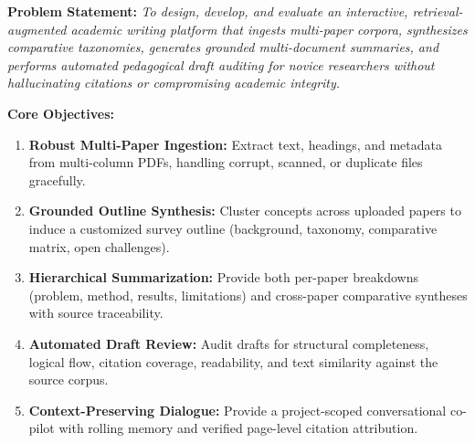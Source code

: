 \documentclass[10pt,a4paper]{article}
\begin{document}
\textbf{Problem Statement:} \textit{To design, develop, and evaluate an interactive, retrieval-augmented academic writing platform that ingests multi-paper corpora, synthesizes comparative taxonomies, generates grounded multi-document summaries, and performs automated pedagogical draft auditing for novice researchers without hallucinating citations or compromising academic integrity.}

\textbf{Core Objectives:}
\begin{enumerate}
    \item \textbf{Robust Multi-Paper Ingestion:} Extract text, headings, and metadata from multi-column PDFs, handling corrupt, scanned, or duplicate files gracefully.
    \item \textbf{Grounded Outline Synthesis:} Cluster concepts across uploaded papers to induce a customized survey outline (background, taxonomy, comparative matrix, open challenges).
    \item \textbf{Hierarchical Summarization:} Provide both per-paper breakdowns (problem, method, results, limitations) and cross-paper comparative syntheses with source traceability.
    \item \textbf{Automated Draft Review:} Audit drafts for structural completeness, logical flow, citation coverage, readability, and text similarity against the source corpus.
    \item \textbf{Context-Preserving Dialogue:} Provide a project-scoped conversational co-pilot with rolling memory and verified page-level citation attribution.
\end{enumerate}

\end{document}
